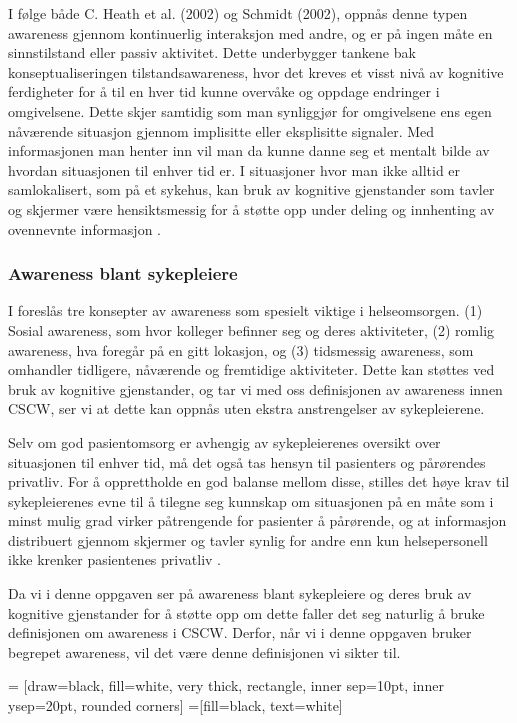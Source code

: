 \noindent
I følge både C. Heath et al. (2002) og Schmidt (2002), oppnås denne typen awareness gjennom kontinuerlig interaksjon med andre, og er på ingen måte en sinnstilstand eller passiv aktivitet. Dette underbygger tankene bak konseptualiseringen tilstandsawareness, hvor det kreves et visst nivå av kognitive ferdigheter for å til en hver tid kunne overvåke og oppdage endringer i omgivelsene. Dette skjer samtidig som man synliggjør for omgivelsene ens egen nåværende situasjon gjennom implisitte eller eksplisitte signaler. Med informasjonen man henter inn vil man da kunne danne seg et mentalt bilde av hvordan situasjonen til enhver tid er. I situasjoner hvor man ikke alltid er samlokalisert, som på et sykehus, kan bruk av kognitive gjenstander som tavler og skjermer være hensiktsmessig for å støtte opp under deling og innhenting av ovennevnte informasjon \cite{Bardram04}. 

\subsubsection{Awareness blant sykepleiere}
I \cite{Randell} foreslås tre konsepter av awareness som spesielt viktige i helseomsorgen. (1) Sosial awareness, som hvor kolleger befinner seg og deres aktiviteter, (2) romlig awareness, hva foregår på en gitt lokasjon, og (3) tidsmessig awareness, som omhandler tidligere, nåværende og fremtidige aktiviteter. 
Dette kan støttes ved bruk av kognitive gjenstander, og tar vi med oss definisjonen av awareness innen CSCW, ser vi at dette kan oppnås uten ekstra anstrengelser av sykepleierene.

\noindent
Selv om god pasientomsorg er avhengig av sykepleierenes oversikt over situasjonen til enhver tid, må det også tas hensyn til pasienters og pårørendes privatliv. For å opprettholde en god balanse mellom disse, stilles det høye krav til sykepleierenes evne til å tilegne seg kunnskap om situasjonen på en måte som i minst mulig grad virker påtrengende for pasienter å pårørende, og at informasjon distribuert gjennom skjermer og tavler synlig for andre enn kun helsepersonell ikke krenker pasientenes privatliv \cite{Ebright10}.

\noindent
Da vi i denne oppgaven ser på awareness blant sykepleiere og deres bruk av kognitive gjenstander for å støtte opp om dette faller det seg naturlig å bruke definisjonen om awareness i CSCW. Derfor, når vi i denne oppgaven bruker begrepet awareness, vil det være denne definisjonen vi sikter til.

 = [draw=black, fill=white, very thick,
    rectangle, inner sep=10pt, inner ysep=20pt, rounded corners]
 =[fill=black, text=white]
%

